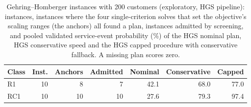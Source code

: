 \begin{table}[t]
\centering
\footnotesize
\setlength{\tabcolsep}{4pt}
\caption{Gehring--Homberger instances with 200 customers (exploratory, HGS pipeline): instances, instances where the four single-criterion solves that set the objective's scaling ranges (the anchors) all found a plan, instances admitted by screening, and pooled validated service-event probability (\%) of the HGS nominal plan, HGS conservative speed and the HGS capped procedure with conservative fallback. A missing plan scores zero.}
\label{tab:gh}
\begin{tabular}{@{}lrrrrrr@{}}
\toprule
Class & Inst. & Anchors & Admitted & Nominal & Conservative & Capped\\
\midrule
R1 & 10 & 8 & 7 & 42.1 & 68.0 & 77.0\\
RC1 & 10 & 10 & 10 & 27.6 & 79.3 & 97.4\\
\bottomrule
\end{tabular}
\end{table}
